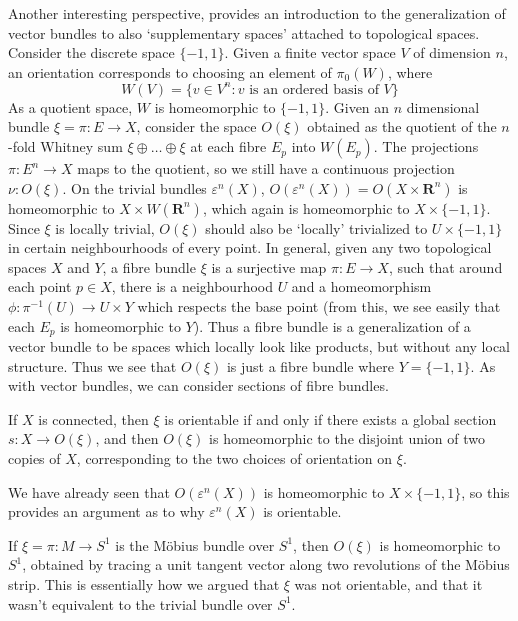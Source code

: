 Another interesting perspective, provides an introduction to the generalization of vector bundles to also `supplementary spaces' attached to topological spaces. Consider the discrete space $\{ -1, 1 \}$. Given a finite vector space $V$ of dimension $n$, an orientation corresponds to choosing an element of $\pi_0(W)$, where
%
\[ W(V) = \{ v \in V^n: \text{$v$ is an ordered basis of $V$} \} \]
%
As a quotient space, $W$ is homeomorphic to $\{ -1, 1 \}$. Given an $n$ dimensional bundle $\xi = \pi: E \to X$, consider the space $O(\xi)$ obtained as the quotient of the $n$-fold Whitney sum $\xi \oplus \dots \oplus \xi$ at each fibre $E_p$ into $W(E_p)$. The projections $\pi: E^n \to X$ maps to the quotient, so we still have a continuous projection $\nu: O(\xi)$. On the trivial bundles $\varepsilon^n(X)$, $O(\varepsilon^n(X)) = O(X \times \mathbf{R}^n)$ is homeomorphic to $X \times W(\mathbf{R}^n)$, which again is homeomorphic to $X \times \{ -1, 1 \}$. Since $\xi$ is locally trivial, $O(\xi)$ should also be `locally' trivialized to $U \times \{ -1, 1 \}$ in certain neighbourhoods of every point. In general, given any two topological spaces $X$ and $Y$, a fibre bundle $\xi$ is a surjective map $\pi: E \to X$, such that around each point $p \in X$, there is a neighbourhood $U$ and a homeomorphism $\phi: \pi^{-1}(U) \to U \times Y$ which respects the base point (from this, we see easily that each $E_p$ is homeomorphic to $Y$). Thus a fibre bundle is a generalization of a vector bundle to be spaces which locally look like products, but without any local structure. Thus we see that $O(\xi)$ is just a fibre bundle where $Y = \{ -1, 1 \}$. As with vector bundles, we can consider sections of fibre bundles.

\begin{theorem}
    If $X$ is connected, then $\xi$ is orientable if and only if there exists a global section $s: X \to O(\xi)$, and then $O(\xi)$ is homeomorphic to the disjoint union of two copies of $X$, corresponding to the two choices of orientation on $\xi$.
\end{theorem}

\begin{example}
    We have already seen that $O(\varepsilon^n(X))$ is homeomorphic to $X \times \{ -1, 1 \}$, so this provides an argument as to why $\varepsilon^n(X)$ is orientable.
\end{example}

\begin{example}
    If $\xi = \pi: M \to S^1$ is the M\"{o}bius bundle over $S^1$, then $O(\xi)$ is homeomorphic to $S^1$, obtained by tracing a unit tangent vector along two revolutions of the M\"{o}bius strip. This is essentially how we argued that $\xi$ was not orientable, and that it wasn't equivalent to the trivial bundle over $S^1$.
\end{example}

